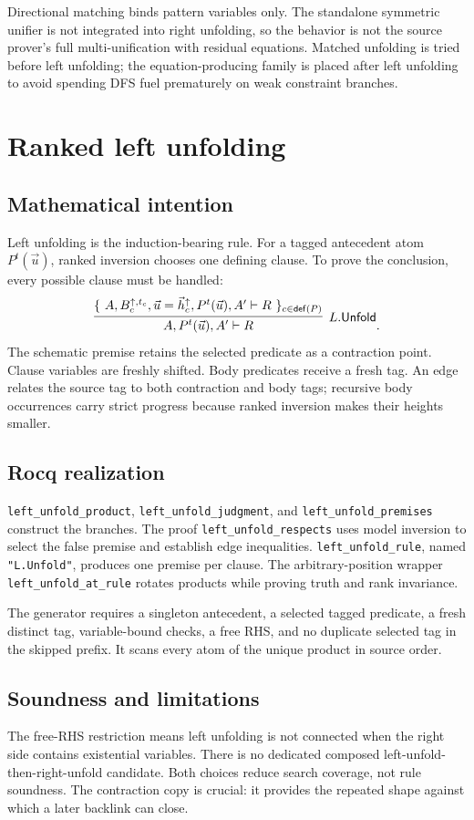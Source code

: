 \documentclass[11pt,oneside]{book}
\DeclareRobustCommand{\code}[1]{\nolinkurl{#1}}
\newcommand{\mathintent}{\subsection*{Mathematical intention}}
\newcommand{\rocqreal}{\subsection*{Rocq realization}}
\newcommand{\soundlim}{\subsection*{Soundness and limitations}}
\begin{document}
Directional matching binds pattern variables only.  The standalone symmetric
unifier is not integrated into right unfolding, so the behavior is not the
source prover's full multi-unification with residual equations.  Matched
unfolding is tried before left unfolding; the equation-producing family is
placed after left unfolding to avoid spending DFS fuel prematurely on weak
constraint branches.

\section{Ranked left unfolding}

\mathintent

Left unfolding is the induction-bearing rule.  For a tagged antecedent atom
\(P^t(\vec u)\), ranked inversion chooses one defining clause.  To prove the
conclusion, every possible clause must be handled:
\[
 \infer[L.\mathsf{Unfold}]
       {A,P^t(\vec u),A'\vdash R}
       {\{\ A,B_c^{\uparrow,t_c},\vec u=\vec h_c^{\uparrow},
                 P^t(\vec u),A'\vdash R\ \}_{c\in\mathsf{def}(P)}}.
\]
The schematic premise retains the selected predicate as a contraction point.
Clause variables are freshly shifted.  Body predicates receive a fresh tag.
An edge relates the source tag to both contraction and body tags; recursive
body occurrences carry strict progress because ranked inversion makes their
heights smaller.

\rocqreal

\code{left_unfold_product}, \code{left_unfold_judgment}, and
\code{left_unfold_premises} construct the branches.  The proof
\code{left_unfold_respects} uses model inversion to select the false premise
and establish edge inequalities.  \code{left_unfold_rule}, named
\code{"L.Unfold"}, produces one premise per clause.  The
arbitrary-position wrapper \code{left_unfold_at_rule} rotates products while
proving truth and rank invariance.

The generator requires a singleton antecedent, a selected tagged predicate, a
fresh distinct tag, variable-bound checks, a free RHS, and no duplicate
selected tag in the skipped prefix.  It scans every atom of the unique product
in source order.

\soundlim

The free-RHS restriction means left unfolding is not connected when the right
side contains existential variables.  There is no dedicated composed
left-unfold-then-right-unfold candidate.  Both choices reduce search coverage,
not rule soundness.  The contraction copy is crucial: it provides the repeated
shape against which a later backlink can close.
\end{document}
